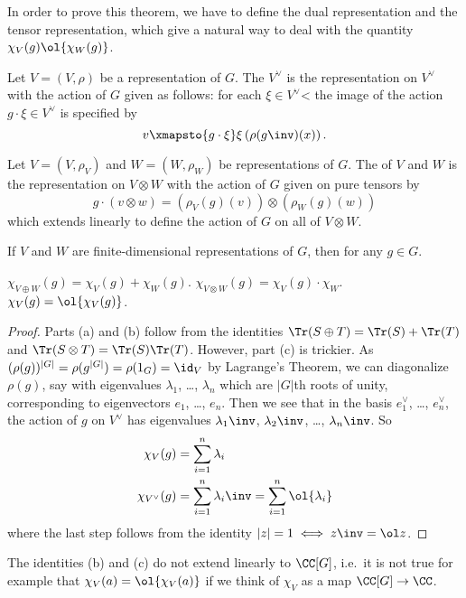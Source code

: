 In order to prove this theorem, we have to define
the dual representation and the tensor representation,
which give a natural way to deal with the quantity $\chi_V(g)\ol{\chi_W(g)}$.
\begin{definition}
	Let $V = (V, \rho)$ be a representation of $G$.
	The  $V^\vee$ is the representation on $V^\vee$
	with the action of $G$ given as follows:
	for each $\xi \in V^\vee$< the image of the action $g \cdot \xi \in V^\vee$
	is specified by
	\[ v \xmapsto{g \cdot \xi} \xi\left( \rho(g\inv)(x) \right). \]
\end{definition}
\begin{definition}
	Let $V = (V, \rho_V)$ and $W = (W, \rho_W)$ be representations of $G$.
	The  of $V$ and $W$ is the representation
	on $V \otimes W$ with the action of $G$ given on pure tensors by
	\[
		g \cdot (v \otimes w)
		= 
		(\rho_V(g)(v)) \otimes (\rho_W(g)(w)) \]
	which extends linearly to define the action of $G$ on all of $V \otimes W$.
\end{definition}

\begin{theorem}
	If $V$ and $W$ are finite-dimensional representations of $G$,
	then for any $g \in G$.
	\begin{enumerate}[(a)]
		\ii $\chi_{V \oplus W}(g) = \chi_V(g) + \chi_W(g)$.
		\ii $\chi_{V \otimes W}(g) = \chi_V(g) \cdot \chi_W$.
		\ii $\chi_{V}(g) = \ol{\chi_V(g)}$.
	\end{enumerate}
\end{theorem}
\begin{proof}
	Parts (a) and (b) follow from the identities
	$\Tr(S \oplus T) = \Tr(S) + \Tr(T)$
	and $\Tr(S \otimes T) = \Tr(S) \Tr(T)$.
	However, part (c) is trickier.
	As $(\rho(g))^{|G|} = \rho(g^{|G|}) = \rho(1_G) = \id_V$
	by Lagrange's Theorem, we can diagonalize $\rho(g)$,
	say with eigenvalues $\lambda_1$, \dots, $\lambda_n$
	which are $|G|$th roots of unity,
	corresponding to eigenvectors $e_1$, \dots, $e_n$.
	Then we see that in the basis $e_1^\vee$, \dots, $e_n^\vee$,
	the action of $g$ on $V^\vee$ has eigenvalues
	$\lambda_1\inv$, $\lambda_2\inv$, \dots, $\lambda_n\inv$.
	So
	\begin{align*}
		\chi_V(g) &= \sum_{i=1}^n \lambda_i \\
		\chi_{V^\vee}(g) &= \sum_{i=1}^n \lambda_i\inv
		= \sum_{i=1}^n \ol{\lambda_i}
	\end{align*}
	where the last step follows from the identity $|z|=1 \iff z\inv = \ol z$.
\end{proof}
\begin{remark}
	[Warning]
	The identities (b) and (c) do not extend linearly to $\CC[G]$,
	i.e.\ it is not true for example that $\chi_V(a) = \ol{\chi_V(a)}$
	if we think of $\chi_V$ as a map $\CC[G] \to \CC$.
\end{remark}

